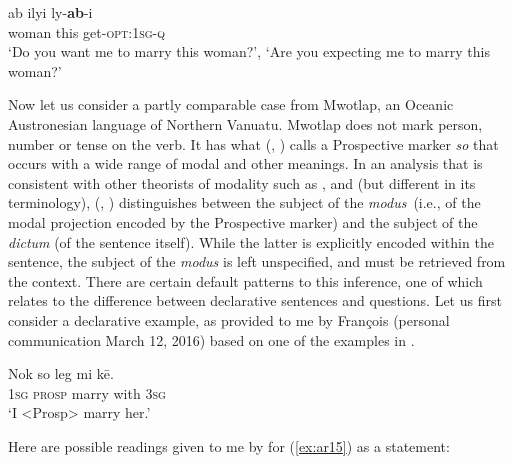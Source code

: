 \documentclass[output=paper]{langsci/langscibook}
\begin{document}
\begin{exe}
	\ex \label{ex:ar14}
	\gll ab ilyi ly-\textbf{ab}-i\\
	woman this get-\textsc{opt}:1\textsc{sg}-\textsc{q}\\
	\trans ‘Do you want me to marry this woman?’, ‘Are you expecting me to marry this woman?’
\end{exe}

Now let us consider a partly comparable case from Mwotlap, an Oceanic Austronesian language of Northern Vanuatu. Mwotlap does not mark person, number or tense on the verb. It has what \citeauthor{Francois2003} (\citeyear{Francois2003}, \citeyear{Francois2004}) calls a Prospective marker \textit{so} that occurs with a wide range of modal and other meanings.  In an analysis that is consistent with other theorists of modality such as \cite{Halliday1970}, \cite{Verstraete2005} and \cite{Lehmann2012} (but different in its terminology), \citeauthor{Francois2003} (\citeyear{Francois2003}, \citeyear{Francois2004}) distinguishes between the subject of the \textit{modus} (i.e., of the modal projection encoded by the Prospective marker) and the subject of the \textit{dictum} (of the sentence itself). While the latter is explicitly encoded within the sentence, the subject of the \textit{modus} is left unspecified, and must be retrieved from the context. There are certain default patterns to this inference, one of which relates to the difference between declarative sentences and questions. Let us first consider a declarative example, as provided to me by François (personal communication March 12, 2016) based on one of the examples in \cite[221]{François2003}.

\begin{exe}
	\ex \label{ex:ar15}
	\gll Nok so leg mi kē.\\
	1\textsc{sg} \textsc{prosp} marry with 3\textsc{sg}\\
	\trans ‘I <Prosp> marry her.’
\end{exe}

Here are possible readings given to me by \citeauthor{Francois2003} for (\ref{ex:ar15}) as a statement:
\end{document}
